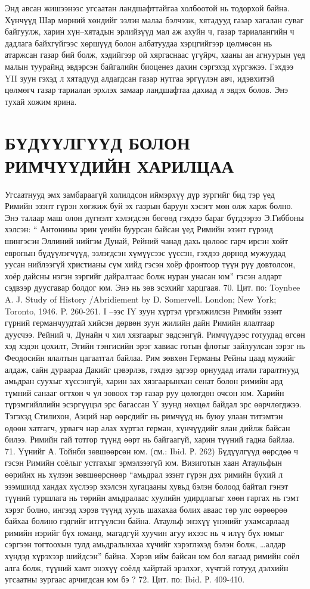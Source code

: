 Энд авсан жишээнээс угсаатан ландшафттайгаа холбоотой нь тодорхой байна. Хүнчүүд Шар мөрний хөндийг эзлэн малаа бэлчээж, хятадууд газар хагалан суваг байгуулж, харин хүн–хятадын эрлийзүүд мал аж ахуйн ч, газар тариалангийн ч дадлага байхгүйгээс хөршүүд болон албатуудаа хэрцгийгээр цөлмөсөн нь атаржсан газар бий болж, хэдийгээр ой хяргаснаас үгүйрч, хааны ан агнуурын үед малын туурайнд эвдэрсэн байгалийн биоценез дахин сэргэхэд хүргэжээ. Гэхдээ YII зуун гэхэд л хятадууд алдагдсан газар нутгаа эргүүлэн авч, идэвхитэй цөлмөгч газар тариалан эрхлэх замаар ландшафтаа дахиад л эвдэх болов. Энэ тухай хожим ярина.
\section{БҮДҮҮЛГҮҮД БОЛОН РИМЧҮҮДИЙН ХАРИЛЦАА}
Угсаатнууд эмх замбараагүй холилдсон иймэрхүү дүр зургийг бид тэр үед Римийн эзэнт гүрэн хөгжиж буй эх газрын баруун хэсэгт мөн олж харж болно. Энэ талаар маш олон дүгнэлт хэлэгдсэн бөгөөд гэхдээ бараг бүгдээрээ Э.Гиббоны хэлсэн: “ Антонины эрин үеийн буурсан байсан үед Римийн эзэнт гүрэнд шингэсэн Эллиний нийгэм Дунай, Рейний чанад дахь цөлөөс гарч ирсэн хойт европын бүдүүлэгчүүд, эзлэгдсэн хүмүүсээс үүссэн, гэхдээ дорнод мужуудад уусан нийлээгүй христианы сүм хийд гэсэн хоёр фронтоор түүн рүү довтолсон, хоёр дайсны нэгэн зэргийг дайралтаас болж нуран унасан юм” гэсэн алдарт сэдвээр дуусгавар болдог юм. Энэ нь зөв эсэхийг харцгаая. 70. Цит. по: Toynbee A. J. Study of History /Abridiement by D. Somervell. London; New York; Toronto, 1946. P. 260-261.
I –ээс IY зуун хүртэл үргэлжилсэн Римийн эзэнт гүрний германчуудтай хийсэн дөрвөн зуун жилийн дайн Римийн ялалтаар дуусчээ. Рейний ч, Дунайн ч хил хязгаарыг эвдсэнгүй. Римчүүдээс готуудад өгсөн хэд хэдэн цохилт, Эгийн тэнгисийн эрэг хавиас готын флотыг зайлуулсан зэрэг нь Феодосийн ялалтын цагаатгал байлаа. Рим зөвхөн Германы Рейны цаад мужийг алдаж, сайн дураараа Дакийг цэвэрлэв, гэхдээ эдгээр орнуудад итали гаралтнууд амьдран суухыг хүссэнгүй, харин зах хязгаарынхан сенат болон римийн ард түмний санааг огтхон ч үл зовоох тэр газар руу цөлөгдөн очсон юм. Харийн түрэмгийллийн эсэргүүцэл эрс багассан Y зуунд нөхцөл байдал эрс өөрчлөгджээ. Тэгэхэд Стилихон, Аэций нар өөрсдийг нь римчүүд нь буюу улаан титэмтэн өдөөн хатгагч, урвагч нар алах хүртэл герман, хүнчүүдийг ялан дийлж байсан билээ. Римийн гай тотгор түүнд өөрт нь байгаагүй, харин түүний гадна байлаа. 71. Үүнийг А. Тойнби зөвшөөрсөн юм. (см.: Ibid. Р. 262)
Бүдүүлгүүд өөрсдөө ч гэсэн Римийн соёлыг устгахыг эрмэлзээгүй юм. Визиготын хаан Атаульфын өөрийнх нь хүлээн зөвшөөрснөөр “амьдрал эзэнт гүрэн дэх римийн бүхий л эзэмшилд хандах хүслээр эхэлсэн хугацааны хувьд бэлэн болоод байтал гэнэт түүний туршлага нь төрийн амьдралаас хуулийн удирдлагыг хөөн гаргах нь гэмт хэрэг болно, ингээд хэрэв түүнд хууль шахахаа болих аваас төр улс өөрөөрөө байхаа болино гэдгийг итгүүлсэн байна. Атаульф энэхүү үнэнийг ухамсарлаад римийн нэрийг бүх юманд, магадгүй хуучин агуу ихээс нь ч илүү бүх юмыг сэргээн тогтоохын тулд амьдралынхаа хүчийг хэрэглэхэд бэлэн болж, …алдар хүндэд хүрэхээр шийдсэн” байна. Хэрэв ийм байсан юм бол яагаад римийн соёл алга болж, түүний хамт энэхүү соёлд хайртай эрэлхэг, хүчтэй готууд дэлхийн угсаатны зургаас арчигдсан юм бэ ? 72. Цит. по: Ibid. Р. 409-410.
